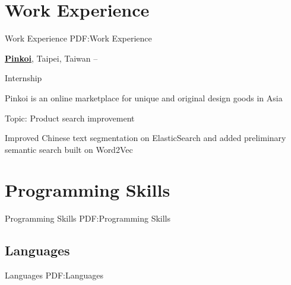 \documentclass[a4paper,12pt,oneside]{article}
\begin{document}
\begin{body}

%


\section
{Work Experience}
{Work Experience}
{PDF:Work Experience}

\href{http://pinkoi.com}
{\textbf{Pinkoi}},
Taipei, Taiwan
\hfill
{} --
\par
Internship
\begin{detail}
    \begin{detailitem}
    \item Pinkoi is an online marketplace for unique and original design goods in Asia
    \item Topic: Product search improvement
    \item Improved Chinese text segmentation on ElasticSearch and added
        preliminary semantic search built on Word2Vec
    \end{detailitem}
\end{detail}



\section
{Programming Skills}
{Programming Skills}
{PDF:Programming Skills}

\subsection
{Languages}
{Languages}
{PDF:Languages}


\end{body}
\end{document}

